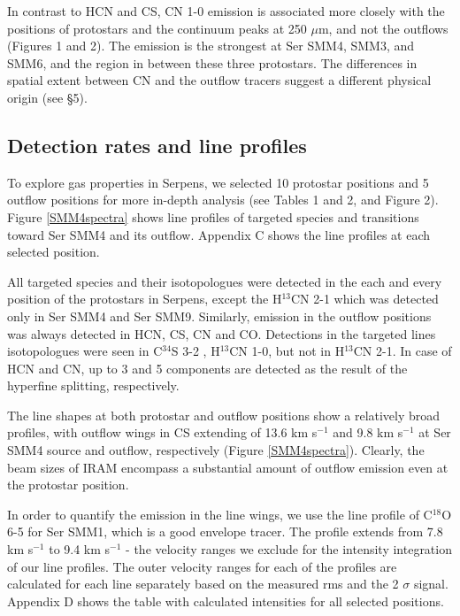 \documentclass{aa}
\begin{document}
In contrast to HCN and CS, CN 1-0 emission is associated more closely with the positions of protostars
and the continuum peaks at 250 $\mu$m, and not the outflows (Figures 1 and 2). The emission is the strongest at
Ser SMM4, SMM3, and SMM6, and the region in between these three protostars. The differences in 
spatial extent between CN and the outflow tracers suggest a different physical origin (see \S 5).

\subsection{Detection rates and line profiles}
To explore gas properties in Serpens, we selected 10 protostar positions and 5 
outflow positions for more in-depth analysis (see Tables 1 and 2, and Figure 2). Figure \ref{SMM4spectra} shows 
line profiles of targeted species and transitions toward Ser SMM4 and its outflow. Appendix 
C shows the line profiles at each selected position. 

All targeted species and their isotopologues were detected in the each and every position 
of the protostars in Serpens, except the H$^{13}$CN 2-1 which was detected only in Ser SMM4 and Ser SMM9. Similarly, emission in the outflow 
positions was always detected in HCN, CS, CN and CO. Detections in the targeted lines isotopologues were seen in C$^{34}$S 3-2 , H$^{13}$CN 1-0, but not in H$^{13}$CN 2-1.
In case of HCN and CN, up to 3 and 5 components are detected as the result of the hyperfine splitting, respectively. 

The line shapes at both protostar and outflow positions show a relatively broad profiles, 
with outflow wings in CS extending of 13.6 km s$^{-1}$ and 9.8 km s$^{-1}$ at Ser SMM4 
source and outflow, respectively (Figure \ref{SMM4spectra}). Clearly, the beam sizes of 
IRAM encompass a substantial amount of outflow emission even at the protostar position. 

In order to quantify the emission in the line wings, we use the line profile of C$^{18}$O 6-5
for Ser SMM1, which is a good envelope tracer. The profile extends from 
7.8 km s$^{-1}$ to 9.4 km s$^{-1}$ - the velocity ranges we exclude for the intensity integration of our line profiles. The outer velocity ranges for each of the profiles are calculated 
for each line separately based on the measured rms and the 2 $\sigma$ signal. Appendix D 
shows the table with calculated intensities for all selected positions.
\end{document}
